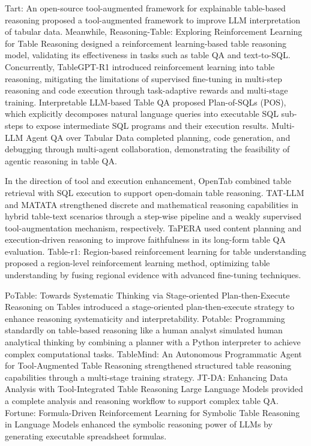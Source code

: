 Tart: An open-source tool-augmented framework for explainable table-based reasoning \cite{tart2024} proposed a tool-augmented framework to improve LLM interpretation of tabular data. Meanwhile, Reasoning-Table: Exploring Reinforcement Learning for Table Reasoning \cite{reasoningtable2025} designed a reinforcement learning-based table reasoning model, validating its effectiveness in tasks such as table QA and text-to-SQL. Concurrently, TableGPT-R1 \cite{yang2025tablegpt} introduced reinforcement learning into table reasoning, mitigating the limitations of supervised fine-tuning in multi-step reasoning and code execution through task-adaptive rewards and multi-stage training. Interpretable LLM-based Table QA \cite{nguyen2024interpretable} proposed Plan-of-SQLs (POS), which explicitly decomposes natural language queries into executable SQL sub-steps to expose intermediate SQL programs and their execution results. Multi-LLM Agent QA over Tabular Data \cite{bangar-etal-2025-exploration} completed planning, code generation, and debugging through multi-agent collaboration, demonstrating the feasibility of agentic reasoning in table QA.

In the direction of tool and execution enhancement, OpenTab \cite{kong2024opentab} combined table retrieval with SQL execution to support open-domain table reasoning. TAT-LLM \cite{zhu2024tat} and MATATA \cite{vinayagame2025matata} strengthened discrete and mathematical reasoning capabilities in hybrid table-text scenarios through a step-wise pipeline and a weakly supervised tool-augmentation mechanism, respectively. TaPERA \cite{zhao2024tapera} used content planning and execution-driven reasoning to improve faithfulness in its long-form table QA evaluation. Table-r1: Region-based reinforcement learning for table understanding \cite{tabler12025} proposed a region-level reinforcement learning method, optimizing table understanding by fusing regional evidence with advanced fine-tuning techniques.

PoTable: Towards Systematic Thinking via Stage-oriented Plan-then-Execute Reasoning on Tables \cite{potable2024} introduced a stage-oriented plan-then-execute strategy to enhance reasoning systematicity and interpretability. Potable: Programming standardly on table-based reasoning like a human analyst \cite{potable2025} simulated human analytical thinking by combining a planner with a Python interpreter to achieve complex computational tasks. TableMind: An Autonomous Programmatic Agent for Tool-Augmented Table Reasoning \cite{tablemind2025} strengthened structured table reasoning capabilities through a multi-stage training strategy. JT-DA: Enhancing Data Analysis with Tool-Integrated Table Reasoning Large Language Models \cite{jt-da2025} provided a complete analysis and reasoning workflow to support complex table QA. Fortune: Formula-Driven Reinforcement Learning for Symbolic Table Reasoning in Language Models \cite{fortune2025} enhanced the symbolic reasoning power of LLMs by generating executable spreadsheet formulas.

